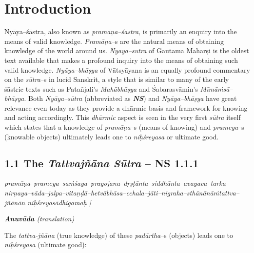 
\chapter{Introduction}\label{chapter1}

\vspace{-.2cm}

Nyāya–śāstra, also known as \textit{pramāṇa–śāstra}, is primarily an enquiry into the means of valid knowledge. \textit{Pramāṇa–}s are the natural means of obtaining knowledge of the world around us. \textit{Nyāya–sūtra} of Gautama Maharṣi  is the oldest text available that makes a profound inquiry into the means of obtaining such valid knowledge. \textit{Nyāya–bhāṣya} of Vātsyāyana is an equally profound commentary on the \textit{sūtra}–s in lucid Sanskrit, a style that is similar to many of the early śāstric texts such as Patañjali’s \textit{Mahābhāṣya} and Śabarasvāmin’s \textit{Mīmāṁsā–bhāṣya}. Both \textit{Nyāya–sūtra }(abbreviated as \textit{\textbf{NS}}) and \textit{Nyāya–bhāṣya} have great relevance even today as they provide a dhārmic basis and framework for knowing and acting accordingly. This \textit{dhārmic} aspect is seen in the very first \textit{sūtra} itself which states that a knowledge of \textit{pramāṇa}–s (means of knowing) and \textit{prameya}–s (knowable objects) ultimately leads one to \textit{niḥśreyasa} or ultimate good.

\vspace{-.3cm}

\section*{1.1 The {\it {\bfseries Tattvajñāna Sūtra}} – NS 1.1.1}

\begin{myquote}
\textit{pramāṇa–prameya–saṁśaya–prayojana–dṛṣṭānta–siddhānta–avayava–tarka–\break nirṇaya–vāda–jalpa–vitaṇḍā–hetvābhāsa–cchala–jāti–nigraha–sthānānāṁ\break tattva–jñānān niḥśreyasādhigamaḥ |}
\end{myquote}

\textit{\textbf{Anuvāda} (translation)}

The \textit{tattva-jñāna} (true knowledge) of these \textit{padārtha}–s (objects) leads one to \textit{niḥśreyasa} (ultimate good): 

